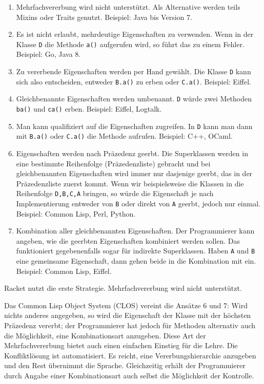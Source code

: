 \begin{enumerate}
 \item Mehrfachvererbung wird nicht unterstützt. Als Alternative werden teils Mixins oder Traits genutzt. Beispiel: Java bis Version 7.
 \item Es ist nicht erlaubt, mehrdeutige Eigenschaften zu verwenden. Wenn in der Klasse \texttt{D} die Methode \texttt{a()} aufgerufen wird, so führt das zu einem Fehler. Beispiel: Go, Java 8.
 \item Zu vererbende Eigenschaften werden per Hand gewählt. Die Klasse \texttt{D} kann sich also entscheiden, entweder \texttt{B.a()} zu erben oder \texttt{C.a()}. Beispiel: Eiffel.
 \item Gleichbenannte Eigenschaften werden umbenannt. \texttt{D} würde zwei Methoden \texttt{ba()} und \texttt{ca()} erben. Beispiel: Eiffel, Logtalk.
 \item Man kann qualifiziert auf die Eigenschaften zugreifen. In \texttt{D} kann man dann mit \texttt{B.a()} oder \texttt{C.a()} die Methode aufrufen. Beispiel: C++, OCaml.
 \item Eigenschaften werden nach Präzedenz geerbt. Die Superklassen werden in eine bestimmte Reihenfolge (Präzedenzliste) gebracht und bei gleichbenannten Eigenschaften wird immer nur dasjenige geerbt, das in der Präzedenzliste zuerst kommt. Wenn wir beispielsweise die Klassen in die Reihenfolge \texttt{D,B,C,A} bringen, so würde die Eigenschaft je nach Implementierung entweder von \texttt{B} oder direkt von \texttt{A} geerbt, jedoch nur einmal. Beispiel: Common Lisp, Perl, Python.
 \item Kombination aller gleichbenannten Eigenschaften. Der Programmierer kann angeben, wie die geerbten Eigenschaften kombiniert werden sollen. Das funktioniert gegebenenfalls sogar für indirekte Superklassen. Haben \texttt{A} und \texttt{B} eine gemeinsame Eigenschaft, dann gehen beide in die Kombination mit ein. Beispiel: Common Lisp, Eiffel.
\end{enumerate}


Racket nutzt die erste Strategie. Mehrfachvererbung wird nicht unterstützt.

Das Common Lisp Object System (CLOS) \cite{keene} vereint die Ansätze 6 und 7: Wird nichts anderes angegeben, so wird die Eigenschaft der Klasse mit der höchsten Präzedenz vererbt; der Programmierer hat jedoch für Methoden alternativ auch die Möglichkeit, eine Kombinationsart anzugeben. Diese Art der Mehrfachvererbung bietet auch einen einfachen Einstieg für die Lehre. Die Konfliktlösung ist automatisiert. Es reicht, eine Vererbungshierarchie anzugeben und den Rest übernimmt die Sprache. Gleichzeitig erhält der Programmierer durch Angabe einer Kombinationsart auch selbst die Möglichkeit der Kontrolle.

